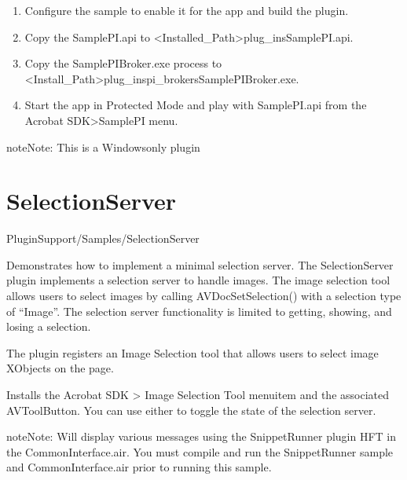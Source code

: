 \documentclass[letterpaper,12pt,english,openany,oneside]{sphinxmanual}
\begin{document}
\label{\detokenize{Samples_Plug_in:usage-6}}
\begin{enumerate}
%
\item {} 
Configure the sample to enable it for the app and build the plugin.

\item {} 
Copy the SamplePI.api to <Installed\_Path>plug\_insSamplePI.api.

\item {} 
Copy the SamplePIBroker.exe process to <Install\_Path>plug\_inspi\_brokersSamplePIBroker.exe.

\item {} 
Start the app in Protected Mode and play with SamplePI.api from the Acrobat SDK\sphinxhyphen{}>SamplePI menu.

\end{enumerate}

\begin{sphinxadmonition}{note}{Note:}
This is a Windows\sphinxhyphen{}only plugin
\end{sphinxadmonition}


\section{SelectionServer}
\label{\detokenize{Samples_Plug_in:selectionserver}}

PluginSupport/Samples/SelectionServer

\label{\detokenize{Samples_Plug_in:description-9}}

Demonstrates how to implement a minimal selection server. The SelectionServer plugin implements a selection server to handle images. The image selection tool allows users to select images by calling AVDocSetSelection() with a selection type of “Image”. The selection server functionality is limited to getting, showing, and losing a selection.

\label{\detokenize{Samples_Plug_in:usage-7}}

The plugin registers an Image Selection tool that allows users to select image XObjects on the page.

Installs the Acrobat SDK > Image Selection Tool menuitem and the associated AVToolButton. You can use either to toggle the state of the selection server.

\begin{sphinxadmonition}{note}{Note:}
Will display various messages using the SnippetRunner plugin HFT in the CommonInterface.air. You must compile and run the SnippetRunner sample and CommonInterface.air prior to running this sample.
\end{sphinxadmonition}
\end{document}

